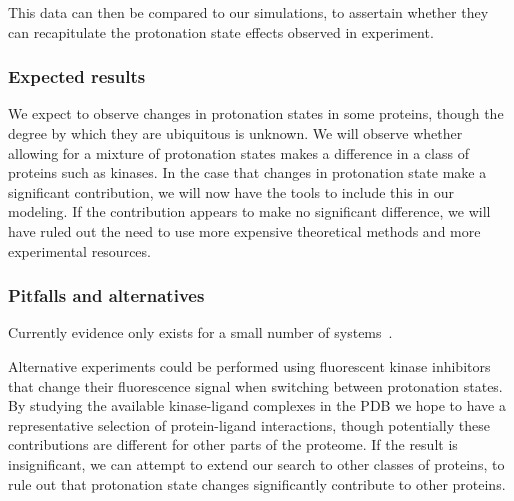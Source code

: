 \documentclass[10pt,final]{article}
\newcommand{\pH}{p$\mathrm{H}$\ }
\begin{document}
This data can then be compared to our simulations, to assertain whether they can recapitulate the protonation state effects observed in experiment.

\todo[inline,color=violet!40]{short explanation constant-\pH simulations}

\subsubsection*{Expected results}
We expect to observe changes in protonation states in some proteins, though the degree by which they are ubiquitous is unknown. We will observe whether allowing for a mixture of protonation states makes a difference in a class of proteins such as kinases. In the case that changes in protonation state make a significant contribution, we will now have the tools to include this in our modeling. If the contribution appears to make no significant difference, we will have ruled out the need to use more expensive theoretical methods and more experimental resources.


\subsubsection*{Pitfalls and alternatives}
{}

Currently evidence only exists for a small number of systems~\cite{Aleksandrov2007a,Czodrowski2007a}.

Alternative experiments could be performed using fluorescent kinase inhibitors that change their fluorescence signal when switching between protonation states.
By studying the available kinase-ligand complexes in the PDB we hope to have a representative selection of protein-ligand interactions, though potentially these contributions are different for other parts of the proteome. If the result is insignificant, we can attempt to extend our search to other classes of proteins, to rule out that protonation state changes significantly contribute to other proteins.
\end{document}

